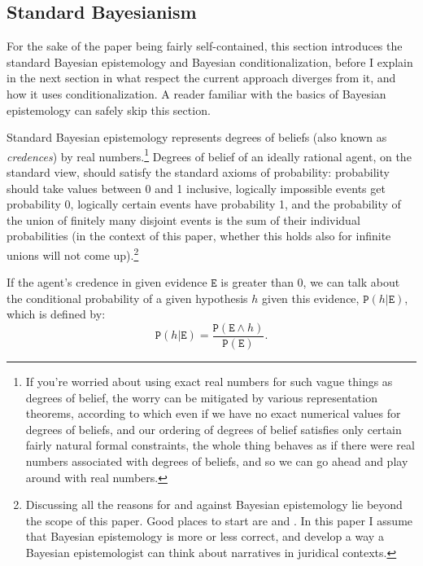 \documentclass[10pt,leqno]{article}
\newcommand{\et}{\wedge}
\newcommand{\pr}[1]{\mbox{$\mathtt{P}(#1)$}}
\begin{document}
\subsection{Standard Bayesianism}\label{sec:standard_bayesianism}


For the sake of the paper being fairly self-contained, this section introduces the standard Bayesian epistemology and Bayesian conditionalization, before I explain in the next section in what respect the current approach diverges from it, and how it uses conditionalization. A reader familiar with the basics of Bayesian epistemology can safely skip this section. 



Standard Bayesian epistemology \citep{DeFinetti1937,Ramsey1978,bradley2015critical} represents  degrees of beliefs (also known as \emph{credences}) by real numbers.\footnote{If you're worried about using exact real numbers for such vague things as degrees of belief, the worry can be mitigated by various representation theorems, according to which even if we have no exact numerical values for degrees of beliefs, and our  ordering of degrees of belief satisfies only certain fairly natural formal constraints, the whole thing behaves as if there were real numbers associated with degrees of beliefs, and so we can  go ahead and play around with real numbers.}  Degrees of belief of an ideally rational agent, on the standard view, should satisfy the standard axioms of probability: probability should take values between 0 and 1 inclusive, logically impossible events get probability 0, logically certain events have probability 1, and the probability of the union of finitely many disjoint events is the sum of their individual probabilities (in the context of this paper, whether this holds also for infinite unions will not come up).\footnote{Discussing all the reasons for and against Bayesian epistemology lie beyond the scope of this paper. Good places to start are \citep{bradley2015critical} and \citep{earman1992bayes}. In this paper I assume that Bayesian epistemology is more or less correct, and  develop a way a Bayesian epistemologist can think about  narratives in juridical contexts.}

 If the agent's credence in given evidence $\mathtt{E}$ is greater than 0, we can talk about the conditional probability of a given hypothesis $h$ given this evidence, $\pr{h\vert  \mathtt{E}}$, which is defined by:
\[\pr{h\vert \mathtt{E}}=\frac{\pr{\mathtt{E}\et h}}{\pr{\mathtt{E}}}.\] 
\end{document}
